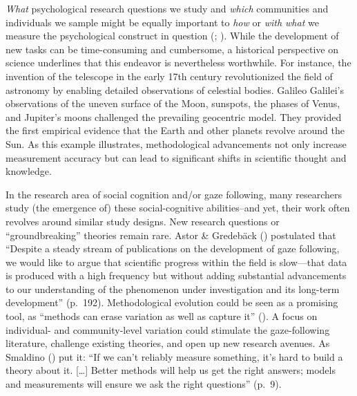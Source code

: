 \documentclass[
]{scrbook}
\begin{document}
\emph{What} psychological research questions we study and \emph{which} communities and individuals we sample might be equally important to \emph{how} or \emph{with what} we measure the psychological construct in question (; ). While the development of new tasks can be time-consuming and cumbersome, a historical perspective on science underlines that this endeavor is nevertheless worthwhile. For instance, the invention of the telescope in the early 17th century revolutionized the field of astronomy by enabling detailed observations of celestial bodies. Galileo Galilei's observations of the uneven surface of the Moon, sunspots, the phases of Venus, and Jupiter's moons challenged the prevailing geocentric model. They provided the first empirical evidence that the Earth and other planets revolve around the Sun. As this example illustrates, methodological advancements not only increase measurement accuracy but can lead to significant shifts in scientific thought and knowledge.

In the research area of social cognition and/or gaze following, many researchers study (the emergence of) these social-cognitive abilities\thinspace --\thinspace and yet, their work often revolves around similar study designs. New research questions or ``groundbreaking'' theories remain rare. Astor \& Gredebäck () postulated that ``Despite a steady stream of publications on the development of gaze following, we would like to argue that scientific progress within the field is slow---that data is produced with a high frequency but without adding substantial advancements to our understanding of the phenomenon under investigation and its long-term development'' (p.~192). Methodological evolution could be seen as a promising tool, as ``methods can erase variation as well as capture it'' (). A focus on individual- and community-level variation could stimulate the gaze-following literature, challenge existing theories, and open up new research avenues. As Smaldino () put it: ``If we can't reliably measure something, it's hard to build a theory about it. {[}\ldots{]} Better methods will help us get the right answers; models and measurements will ensure we ask the right questions'' (p.~9).
\end{document}
